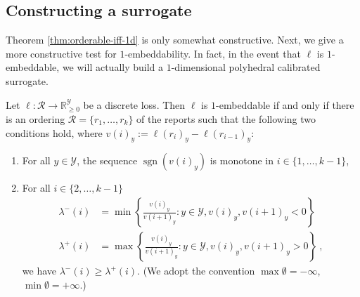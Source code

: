 \documentclass[anon]{colt2020} %
\newcommand{\reals}{\mathbb{R}}
\newcommand{\nonnegreals}{\reals_{\geq 0}}%
\newcommand{\R}{\mathcal{R}}
\newcommand{\Y}{\mathcal{Y}}
\DeclareMathOperator*{\sgn}{sgn}
\begin{document}
\subsection{Constructing a surrogate}
Theorem \ref{thm:orderable-iff-1d} is only somewhat constructive.
Next, we give a more constructive test for $1$-embeddability.
In fact, in the event that $\ell$ is $1$-embeddable, we will actually build a $1$-dimensional polyhedral calibrated surrogate.


\begin{theorem} \label{thm:construct-1d-loss}
  Let $\ell: \R \to \nonnegreals^{\Y}$ be a discrete loss.
  Then $\ell$ is $1$-embeddable if and only if there is an ordering $\R = \{r_1,\ldots,r_k\}$ of the reports such that the following two conditions hold, where $v(i)_y := \ell(r_i)_y - \ell(r_{i-1})_y$:
  \begin{enumerate}
  \item For all $y\in\Y$, the sequence $\sgn(v(i)_y)$ is monotone in
    $i\in\{1,\ldots,k-1\}$,
  \item For all $i\in\{2,\ldots,k-1\}$
    \begin{align*}
      \lambda^-(i) &= \min \left\{\frac{v(i)_y}{v({i+1})_y} : y\in\Y, v(i)_y, v({i+1})_y < 0\right\}
      \\
      \lambda^+(i) &= \max \left\{\frac{v(i)_y}{v({i+1})_y} : y\in\Y, v(i)_y, v({i+1})_y > 0\right\}~,
    \end{align*}
    we have $\lambda^-(i) \geq \lambda^+(i)$.
    (We adopt the convention $\max\emptyset = -\infty$, $\min\emptyset = +\infty$.)
  \end{enumerate}


\end{theorem}
\end{document}
